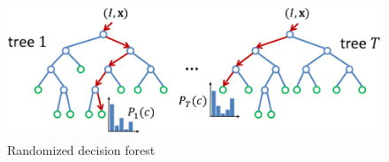 \begin{figure}
	[h] \centering 
	\includegraphics[height=4cm]{figures/content/ni-decision.jpg} \caption{Randomized decision forest} \label{fg:ni:decision} 
\end{figure}
